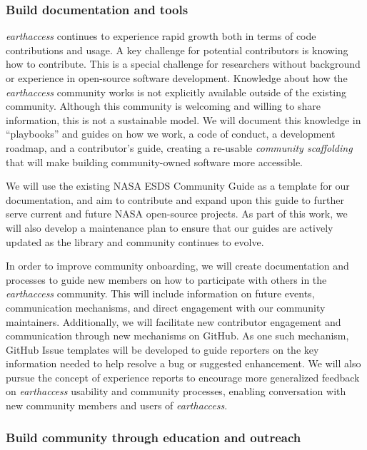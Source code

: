 \documentclass{ROSES-NASA-proposal}
\newcommand{\earthaccess}{\textit{earthaccess}\xspace} %
\begin{document}
\subsubsection{Build documentation and tools} \label{docs}

\earthaccess continues to experience rapid growth both in terms of code contributions and usage. A key challenge for potential contributors is knowing how to contribute. This is a special challenge for researchers without background or experience in open-source software development. Knowledge about how the \earthaccess community works is not explicitly available outside of the existing community. Although this community is welcoming and willing to share information, this is not a sustainable model. We will document this knowledge in ``playbooks'' and guides on how we work, a code of conduct, a development roadmap, and a contributor's guide, creating a re-usable \textit{community scaffolding} that will make building community-owned software more accessible.
 
We will use the existing NASA ESDS Community Guide \citep{ESIPCommunityGuide} as a template for our documentation, and aim to contribute and expand upon this guide to further serve current and future NASA open-source projects. As part of this work, we will also develop a maintenance plan to ensure that our guides are actively updated as the library and community continues to evolve. 

In order to improve community onboarding, we will create documentation and processes to guide new members on how to participate with others in the \earthaccess community. This will include information on future events, communication mechanisms, and direct engagement with our community maintainers. Additionally, we will facilitate new contributor engagement and communication through new mechanisms on GitHub. As one such mechanism, GitHub Issue templates will be developed to guide reporters on the key information needed to help resolve a bug or suggested enhancement. We will also pursue the concept of experience reports to encourage more generalized feedback on \earthaccess usability and community processes, enabling conversation with new community members and users of \earthaccess.


\subsubsection{Build community through education and outreach} \label{edu}
\end{document}
